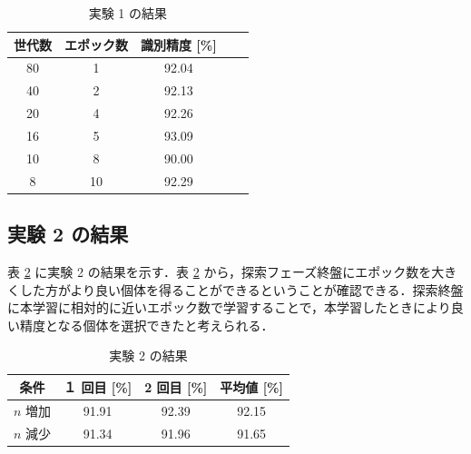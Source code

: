 \documentclass[twocolumn]{jarticle}     %
\begin{document}

\begin{table}[ht]
    \centering
    \caption{実験 1 の結果}
    \begin{tabular}{|c|c|c|c|c|}
        \hline
        世代数&エポック数&識別精度 [\%] \\ \hline
        80&1&92.04 \\ \hline
        40&2&92.13 \\ \hline
        20&4&92.26 \\ \hline
        16&5&93.09 \\ \hline
        10&8&90.00 \\ \hline
        8&10&92.29 \\ \hline
    \end{tabular}
    \label{実験1_結果}
\end{table}

\subsection{実験 2 の結果}
表 \ref{実験2_結果} に実験 2 の結果を示す．表 \ref{実験2_結果} から，探索フェーズ終盤にエポック数を大きくした方がより良い個体を得ることができるということが確認できる．探索終盤に本学習に相対的に近いエポック数で学習することで，本学習したときにより良い精度となる個体を選択できたと考えられる．

\begin{table}[ht]
    \centering
    \caption{実験 2 の結果}
    \begin{tabular}{|c|c|c|c|}
        \hline
        条件& １ 回目 [\%]& 2 回目 [\%]&平均値 [\%] \\ \hline
        $n$ 増加&91.91&92.39&92.15 \\ \hline
        $n$ 減少&91.34&91.96&91.65 \\ \hline
    \end{tabular}
    \label{実験2_結果}
\end{table}
\end{document}
